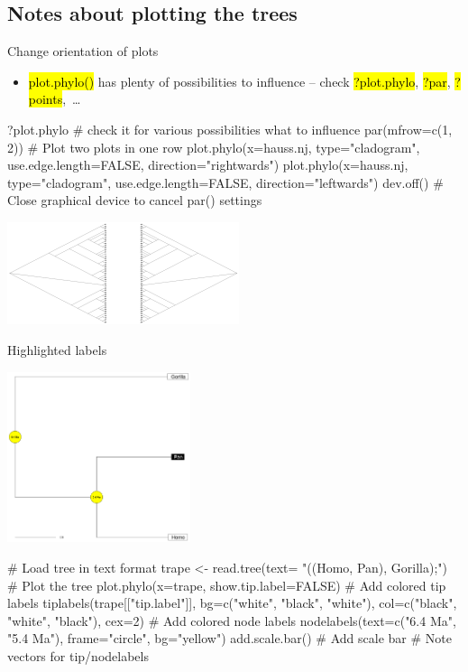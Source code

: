 \documentclass[compress, ucs, xelatex, 11pt, xcolor=svgnames,
  hyperref={
    bookmarks=true,
    unicode=true,
    colorlinks=true,
    pdftitle={Molecular data in R},
    plainpages=false,
    pdfauthor={Vojtech Zeisek},
    pdfsubject={Course about phylogeny and evolution in R},
    pdfcreator={XeLaTeX},
    pdfkeywords={R, evolution, phylogeny, molecular data},
    linkcolor=Tomato,
    anchorcolor=SaddleBrown,
    citecolor=Goldenrod,
    filecolor=DarkMagenta,
    menucolor=Sienna,
    urlcolor=DarkTurquoise,
    pdftex},
  url={hyphens, lowtilde} %
  ]{beamer}
\renewcommand{\texttt}[1]{\hl{\ttfamily #1}}
\begin{document}
\subsection{Notes about plotting the trees}

\begin{frame}[fragile]{Change orientation of plots}
  \begin{itemize}
    \item \alert{\texttt{plot.phylo()} has plenty of possibilities to influence -- check \texttt{?plot.phylo}, \texttt{?par}, \texttt{?points},~\ldots}
  \end{itemize}
  \begin{spluscode}
    ?plot.phylo # check it for various possibilities what to influence
    par(mfrow=c(1, 2)) # Plot two plots in one row
    plot.phylo(x=hauss.nj, type="cladogram", use.edge.length=FALSE,
      direction="rightwards")
    plot.phylo(x=hauss.nj, type="cladogram", use.edge.length=FALSE,
      direction="leftwards")
    dev.off() # Close graphical device to cancel par() settings
  \end{spluscode}
  \begin{center}
    \includegraphics[height=3cm]{lr.png}
  \end{center}
\end{frame}

\begin{frame}[fragile]{Highlighted labels}
\begin{multicols}{2}
  \vfill
  \includegraphics[height=5cm]{highlight.png}
  \vfill
  \begin{spluscode}
    # Load tree in text format
    trape <- read.tree(text=
      "((Homo, Pan), Gorilla);")
    # Plot the tree
    plot.phylo(x=trape,
      show.tip.label=FALSE)
    # Add colored tip labels
    tiplabels(trape[["tip.label"]],
      bg=c("white", "black",
      "white"), col=c("black",
      "white", "black"), cex=2)
    # Add colored node labels
    nodelabels(text=c("6.4 Ma",
      "5.4 Ma"), frame="circle",
      bg="yellow")
    add.scale.bar() # Add scale bar
    # Note vectors for tip/nodelabels
  \end{spluscode}
\end{multicols}
\end{frame}
\end{document}
